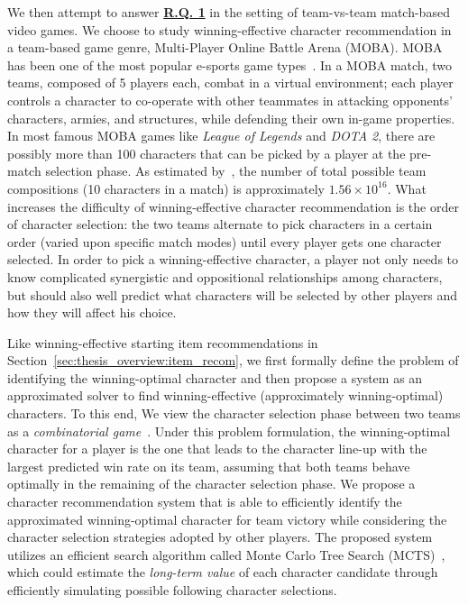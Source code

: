 We then attempt to answer \hyperref[rq1]{\textbf{R.Q. 1}} in the setting of team-vs-team match-based video games. We choose to study winning-effective character recommendation in a team-based game genre, Multi-Player Online Battle Arena (MOBA). MOBA has been one of the most popular e-sports game types~\cite{superdata2016}. In a MOBA match, two teams, composed of 5 players each, combat in a virtual environment; each player controls a character to co-operate with other teammates in attacking opponents' characters, armies, and structures, while defending their own in-game properties. In most famous MOBA games like \textit{League of Legends} and \textit{DOTA 2}, there are possibly more than 100 characters that can be picked by a player at the pre-match selection phase. As estimated by~\cite{hanke2017reco}, the number of total possible team compositions (10 characters in a match) is approximately $1.56 \times 10^{16}$. What increases the difficulty of winning-effective character recommendation is the order of character selection: the two teams alternate to pick characters in a certain order (varied upon specific match modes) until every player gets one character selected. In order to pick a winning-effective character, a player not only needs to know complicated synergistic and oppositional relationships among characters, but should also well predict what characters will be selected by other players and how they will affect his choice. 

Like winning-effective starting item recommendations in Section~\ref{sec:thesis_overview:item_recom}, we first formally define the problem of identifying the winning-optimal character and then propose a system as an approximated solver to find winning-effective (approximately winning-optimal) characters. To this end, We view the character selection phase between two teams as a \textit{combinatorial game}~\cite{browne2012survey}. Under this problem formulation, the winning-optimal character for a player is the one that leads to the character line-up with the largest predicted win rate on its team, assuming that both teams behave optimally in the remaining of the character selection phase.  We propose a character recommendation system that is able to efficiently identify the approximated winning-optimal character for team victory while considering the character selection strategies adopted by other players. The proposed system utilizes an efficient search algorithm called Monte Carlo Tree Search (MCTS)~\cite{kocsis2006bandit}, which could estimate the \textit{long-term value} of each character candidate through efficiently simulating possible following character selections. 

